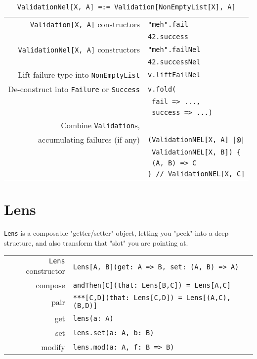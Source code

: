 \documentclass{tufte-handout}
\begin{document}
\begin{table}[ht]
  \centering
  \selectfont
  \begin{tabular}{rl}
    \toprule    
    \texttt{Validation[X, A]} constructors & \texttt{"meh".fail} \\
                                  & \texttt{42.success} \\

    \texttt{ValidationNel[X, A]} constructors & \texttt{"meh".failNel} \\
                                  & \texttt{42.successNel} \\
    Lift failure type into \texttt{NonEmptyList}  & \texttt{v.liftFailNel} \\
    \midrule
    De-construct into \texttt{Failure} or \texttt{Success} & \texttt{v.fold(} \\ & \texttt{  fail => ...,} \\ & \texttt{  success => ...)} \\
    Combine \texttt{Validation}s, \\ accumulating failures (if any) & \texttt{(ValidationNEL[X, A] |@|} \\
    & \texttt{ ValidationNEL[X, B]) \{} \\ 
    & \texttt{    (A, B) => C} \\
    & \texttt{\} // ValidationNEL[X, C]} \\
    \bottomrule
  \end{tabular}
  \caption{\texttt{ValidationNel[X, A] =:= Validation[NonEmptyList[X], A]}}
  \label{tab:normaltab}
\end{table}

\section{Lens}\label{sec:lens}

\texttt{Lens} is a composable "getter/setter" object, letting you "peek" into a deep structure, and also transform that "slot" you are pointing at.

\begin{table}[ht]
  \centering
  \selectfont
  \begin{tabular}{rl}
    \toprule
    \texttt{Lens} constructor & \texttt{Lens[A, B](get: A => B, set: (A, B) => A)} \\
    compose & \texttt{andThen[C](that: Lens[B,C]) = Lens[A,C]} \\
    pair & \texttt{***[C,D](that: Lens[C,D]) = Lens[(A,C),(B,D)]} \\
    \midrule
    get & \texttt{lens(a: A)} \\
    set & \texttt{lens.set(a: A, b: B)} \\
    modify & \texttt{lens.mod(a: A, f: B => B)} \\
    \bottomrule
  \end{tabular}
  \label{tab:normaltab}
\end{table}




\end{document}
